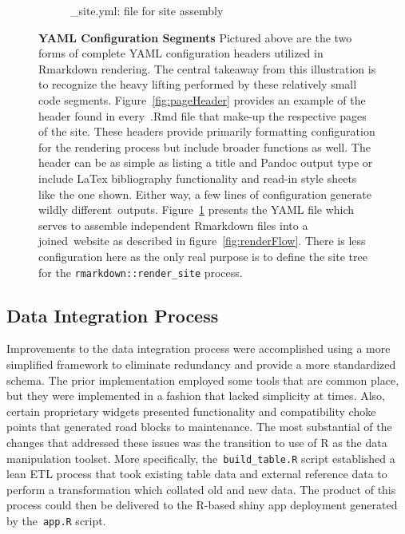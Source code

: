 \documentclass[10pt]{report}
\begin{document}
\begin{figure}
\begin{subfigure}[t]{.4\textwidth}
\caption{\_site.yml: file for site assembly}\label{fig:siteYaml}
\end{subfigure}
\caption[YAML Configuration Segments]{\textbf{YAML Configuration Segments} Pictured above are the two forms of complete YAML configuration headers utilized in Rmarkdown rendering. The central takeaway from this illustration is to recognize the heavy lifting performed by these relatively small code segments. Figure~\ref{fig:pageHeader} provides an example of the header found in every~.Rmd file that make-up the respective pages of the site. These headers provide primarily formatting configuration for the rendering process but include broader functions as well. The header can be as simple as listing a title and Pandoc output type or include LaTex bibliography functionality and read-in style sheets like the one shown. Either way, a few lines of configuration generate wildly different outputs. Figure~\ref{fig:siteYaml} presents the YAML file which serves to assemble independent Rmarkdown files into a joined website as described in figure~\ref{fig:renderFlow}. There is less configuration here as the only real purpose is to define the site tree for the \texttt{rmarkdown::render\_site} process.}\label{fig:yamls}
\end{figure}

\subsection{Data Integration Process}
Improvements to the data integration process were accomplished using a more simplified framework to eliminate redundancy and provide a more standardized schema. The prior implementation employed some tools that are common place, but they were implemented in a fashion that lacked simplicity at times. Also, certain proprietary widgets presented functionality and compatibility choke points that generated road blocks to maintenance. The most substantial of the changes that addressed these issues was the transition to use of R as the data manipulation toolset. More specifically, the~\texttt{build\_table.R} script established a lean ETL process that took existing table data and external reference data to perform a transformation which collated old and new data. The product of this process could then be delivered to the R-based shiny app deployment generated by the~\texttt{app.R} script.
\end{document}
